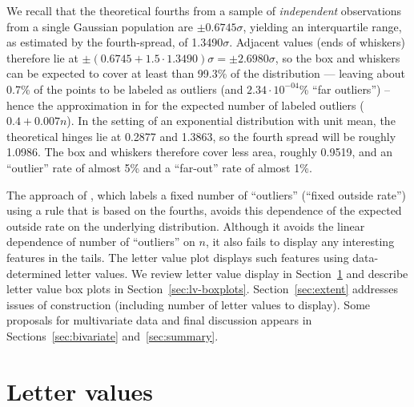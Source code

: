 \documentclass[oneside]{article}
\begin{document}
We recall that the theoretical fourths from a sample of \textit{independent}
observations from a single Gaussian population are $\pm 0.6745\sigma$,
yielding an interquartile range, as estimated by the fourth-spread, of
1.3490$\sigma$. Adjacent values (ends of whiskers) therefore lie at $\pm
(0.6745 + 1.5 \cdot 1.3490)\sigma = \pm 2.6980\sigma$, so the box and whiskers
can be expected to cover at least than 99.3\% of the distribution --- leaving
about 0.7\% of the points to be labeled as outliers (and $2.34 \cdot
10^{-04}$\% ``far outliers'') -- hence the approximation in \citet[pg.
34]{dchlv} for the expected number of labeled outliers ($0.4 + 0.007n$). In
the setting of an exponential distribution with unit mean, the theoretical
hinges lie at 0.2877 and 1.3863, so the fourth spread will be roughly 1.0986.
The box and whiskers therefore cover less area, roughly 0.9519, and an
``outlier'' rate of almost 5\% and a ``far-out'' rate of almost 1\%.

The approach of \citet{dchbi}, which labels a fixed number of ``outliers'' (``fixed outside rate'') using a rule that is based on the fourths, avoids this dependence of the expected outside rate on the underlying distribution. Although it avoids the linear dependence of number of ``outliers'' on $n$, it also fails to display any interesting features in the tails. The letter value plot displays such features using data-determined letter values. We review letter value display in Section~\ref{sec:letter-values} and describe letter value box plots in Section~\ref{sec:lv-boxplots}. Section~\ref{sec:extent} addresses issues of construction (including number of letter values to display). Some proposals for multivariate data and final discussion appears in Sections~\ref{sec:bivariate} and~\ref{sec:summary}.

\section{Letter values}
\label{sec:letter-values}
\end{document}
